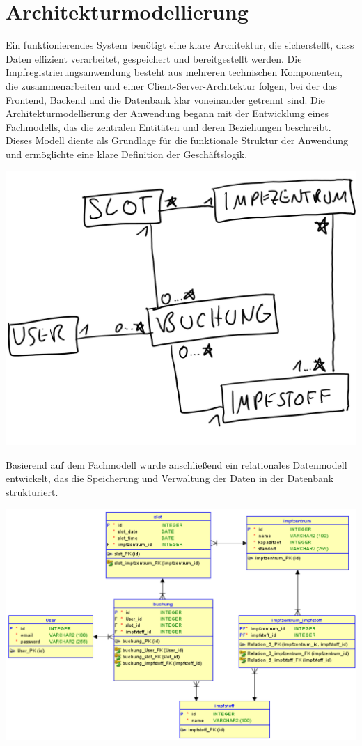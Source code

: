 \section*{Architekturmodellierung}
Ein funktionierendes System benötigt eine klare Architektur, die sicherstellt, dass Daten 
effizient verarbeitet, gespeichert und bereitgestellt werden.
Die Impfregistrierungsanwendung besteht aus mehreren technischen Komponenten, die 
zusammenarbeiten und einer Client-Server-Architektur folgen, bei der das
Frontend, Backend und die Datenbank klar voneinander getrennt sind.
Die Architekturmodellierung der Anwendung begann mit der Entwicklung eines Fachmodells, 
das die zentralen Entitäten und deren Beziehungen beschreibt. Dieses Modell diente als 
Grundlage für die funktionale Struktur der Anwendung und ermöglichte eine klare 
Definition der Geschäftslogik.

\begin{center}
  \includegraphics[width=0.95\linewidth, height=0.45\textheight, keepaspectratio]{src/abbildungen/fachmodell.PNG}
\end{center}

Basierend auf dem Fachmodell wurde anschließend ein relationales Datenmodell entwickelt, 
das die Speicherung und Verwaltung der Daten in der Datenbank strukturiert. 

\begin{center}
  \includegraphics[width=0.95\linewidth, height=0.45\textheight, keepaspectratio]{src/abbildungen/relmodell.png}
\end{center}
